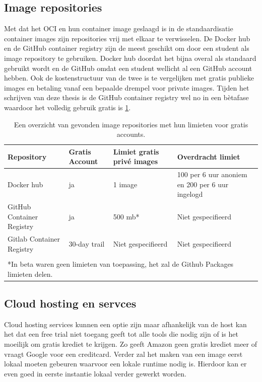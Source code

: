 \subsection{Image repositories}
Met dat het OCI en hun container image geslaagd is in de standaardisatie container images zijn repositories vrij met elkaar te verwisselen. De Docker hub en de GitHub container registry zijn de meest geschikt om door een student als image repository te gebruiken.  Docker hub doordat het bijna overal als standaard gebruikt wordt en de GitHub omdat een student wellicht al een GitHub account hebben. Ook de kostenstructuur van de twee is te vergelijken met gratis publieke images en betaling vanaf een bepaalde drempel voor private images. Tijden het schrijven van deze thesis is de GitHub container registry wel no in een bètafase waardoor het volledig gebruik gratis is \ref{tab:repositories}.
\begin{center}
    \begin{table}
        \begin{tabular}{ m{3.5cm} || m{2cm} | m{3.3cm} | m{4.5cm} }
            Repository & Gratis Account & Limiet gratis privé images & Overdracht limiet \\ 
            \hline
            Docker hub & ja & 1 image & 100 per 6 uur anoniem en 200 per 6 uur ingelogd
             \\  
            \hline
            GitHub Container Registry & ja & 500 mb* & Niet gespecifieerd \\
            \hline 
            Gitlab Container Registry & 30-day trail & Niet gespecifieerd & Niet gespecifieerd \\
            \multicolumn{4}{c}{ } \\
            \multicolumn{4}{l}{*In beta waren geen limieten van toepassing, het zal de Github Packages limieten delen.} \\
        \end{tabular}
        \label{tab:repositories}
        \caption[Overzicht image repositories]{Een overzicht van gevonden image repositories met hun limieten voor gratis accounts.}
    \end{table}
\end{center}

\subsection{Cloud hosting en servces}
Cloud hosting services kunnen een optie zijn maar afhankelijk van de host kan het dat een free trial niet toegang geeft tot alle tools die nodig zijn of is het moeilijk om gratis krediet te krijgen. Zo geeft Amazon geen gratis krediet meer of vraagt Google voor een creditcard.  Verder zal het maken van een image eerst lokaal moeten gebeuren waarvoor een lokale runtime nodig is. Hierdoor kan er even goed in eerste instantie lokaal verder gewerkt worden.

